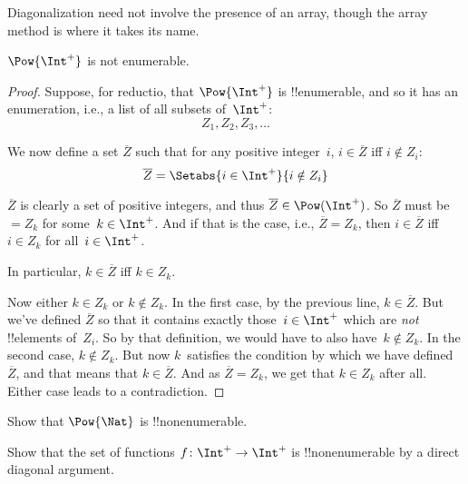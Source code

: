 \documentclass[../../include/open-logic-section]{subfiles}
\begin{document}
Diagonalization need not involve the presence of an array, though the
array method is where it takes its name.

\begin{thm}
$\Pow{\Int^+}$ is not enumerable.
\end{thm}

\begin{proof}
Suppose, for reductio, that $\Pow{\Int^+}$ is !!{enumerable}, and so
it has an enumeration, i.e., a list of all subsets of~$\Int^+$:
\[
Z_{1}, Z_{2}, Z_{3}, \dots
\]

We now define a set $\overline{Z}$ such that for any positive
integer~$i$, $i \in \overline{Z}$ iff $i \notin Z_{i}$:
\[
\overline{Z} = \Setabs{i \in \Int^+}{i \notin Z_i}
\]

$\overline{Z}$ is clearly a set of positive integers, and thus $\overline{Z}
\in \Pow(\Int^+)$. So $\overline{Z}$ must be $= Z_k$ for some~$k \in
\Int^+$.  And if that is the case, i.e., $\overline{Z} = Z_k$, then $i
\in \overline{Z}$ iff $i \in Z_k$ for all~$i \in \Int^+$.

In particular, $k \in \overline{Z}$ iff $k \in Z_k$.

Now either $k \in Z_{k}$ or $k \notin Z_{k}$. In the first case, by
the previous line, $k \in \overline{Z}$. But we've defined
$\overline{Z}$ so that it contains exactly those~$i \in \Int^+$ which
are \emph{not} !!{element}s of~$Z_i$. So by that definition, we would
have to also have~$k \notin Z_k$.  In the second case, $k \notin Z_k$.
But now $k$~satisfies the condition by which we have
defined~$\overline{Z}$, and that means that $k \in \overline{Z}$.  And
as $\overline{Z} = Z_k$, we get that $k \in Z_k$ after all.  Either
case leads to a contradiction.
\end{proof}

\begin{prob}
Show that $\Pow{\Nat}$ is !!{nonenumerable}.
\end{prob}

\begin{prob}
Show that the set of functions $f \colon \Int^+ \to \Int^+$ is
!!{nonenumerable} by a direct diagonal argument.
\end{prob}
\end{document}
